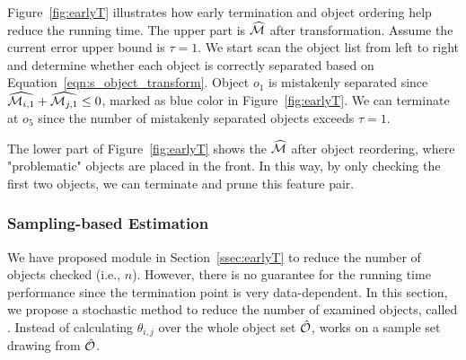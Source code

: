 \begin{example}
Figure~\ref{fig:earlyT} illustrates how early termination and object ordering help reduce the running time. The upper part is $\widehat{\mm}$ after transformation. Assume the current error upper bound is $\tau=1$. We start scan the object list from left to right and determine whether each object is correctly separated based on Equation~\ref{eqn:s_object_transform}. Object $o_1$ is mistakenly separated since $\widehat{\mm_{i,1}}+\widehat{\mm_{j,1}}\leq0$, marked as blue color in Figure~\ref{fig:earlyT}. We can terminate at $o_5$ since the number of mistakenly separated objects exceeds $\tau=1$.

The lower part of Figure~\ref{fig:earlyT} shows the $\widehat{\mm}$ after object reordering, where "problematic" objects are placed in the front. In this way, by only checking the first two objects, we can terminate and prune this feature pair.
\end{example}

\subsubsection{Sampling-based Estimation} \label{ssec:sampling}
We have proposed \earlyT module in Section~\ref{ssec:earlyT} to reduce the number of objects checked (i.e., $n$). However, there is no guarantee for the running time performance since the termination point is very data-dependent. In this section, we propose a stochastic method to reduce the number of examined objects, called \sampling. Instead of calculating $\theta_{i,j}$ over the whole object set $\hat{\oo}$, \sampling works on a sample set drawing from $\hat{\oo}$.

